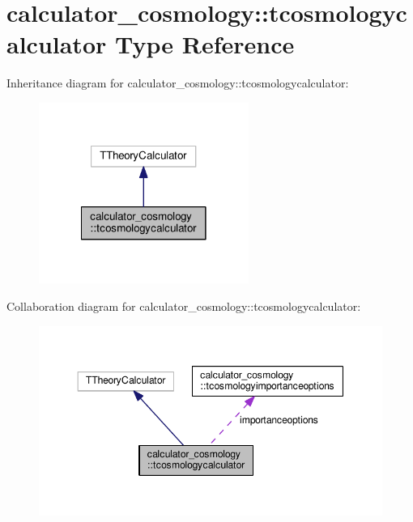 \hypertarget{structcalculator__cosmology_1_1tcosmologycalculator}{}\section{calculator\+\_\+cosmology\+:\+:tcosmologycalculator Type Reference}
\label{structcalculator__cosmology_1_1tcosmologycalculator}


Inheritance diagram for calculator\+\_\+cosmology\+:\+:tcosmologycalculator\+:
\nopagebreak
\begin{figure}[H]
\begin{center}
\leavevmode
\includegraphics[width=194pt]{structcalculator__cosmology_1_1tcosmologycalculator__inherit__graph}
\end{center}
\end{figure}


Collaboration diagram for calculator\+\_\+cosmology\+:\+:tcosmologycalculator\+:
\nopagebreak
\begin{figure}[H]
\begin{center}
\leavevmode
\includegraphics[width=347pt]{structcalculator__cosmology_1_1tcosmologycalculator__coll__graph}
\end{center}
\end{figure}

